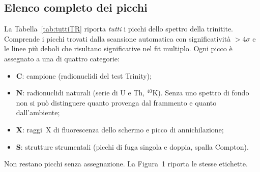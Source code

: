 \documentclass[11pt,a4paper]{article}
\newcommand{\nuc}[2]{\ensuremath{{}^{#1}\mathrm{#2}}}
\begin{document}
\subsection{Elenco completo dei picchi}\label{sec:tuttiTR}

La Tabella~\ref{tab:tuttiTR} riporta \emph{tutti} i picchi dello spettro della trinitite. Comprende i picchi trovati dalla scansione automatica con significatività $>4\sigma$ e le linee più deboli che risultano significative nel fit multiplo. Ogni picco è assegnato a una di quattro categorie:
\begin{itemize}
\item \textbf{C}: campione (radionuclidi del test Trinity);
\item \textbf{N}: radionuclidi naturali (serie di U e Th, \nuc{40}{K}). Senza uno spettro di fondo non si può distinguere quanto provenga dal frammento e quanto dall'ambiente;
\item \textbf{X}: raggi~X di fluorescenza dello schermo e picco di annichilazione;
\item \textbf{S}: strutture strumentali (picchi di fuga singola e doppia, spalla Compton).
\end{itemize}
Non restano picchi senza assegnazione. La Figura~1 riporta le stesse etichette.
\end{document}
